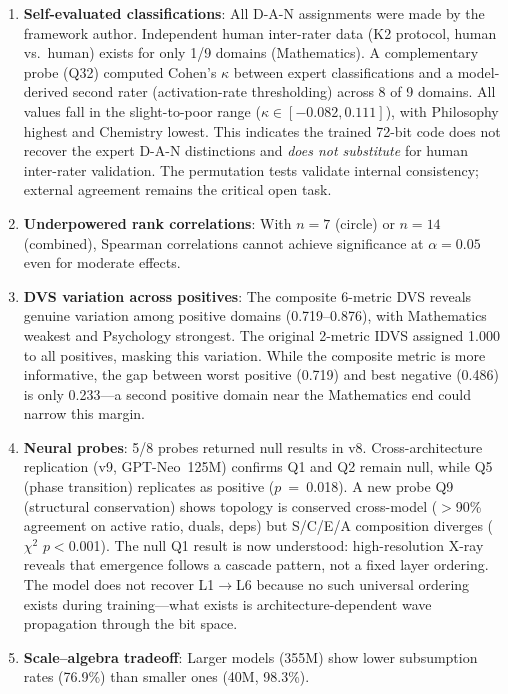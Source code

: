 \documentclass[11pt, a4paper]{article}
\begin{document}
\begin{enumerate}[nosep, leftmargin=*]
    \item \textbf{Self-evaluated classifications}: All D-A-N assignments were made by the framework author. Independent human inter-rater data (K2 protocol, human vs.\ human) exists for only 1/9 domains (Mathematics). A complementary probe (Q32) computed Cohen's $\kappa$ between expert classifications and a model-derived second rater (activation-rate thresholding) across 8 of 9 domains. All values fall in the slight-to-poor range ($\kappa \in [-0.082, 0.111]$), with Philosophy highest and Chemistry lowest. This indicates the trained 72-bit code does not recover the expert D-A-N distinctions and \emph{does not substitute} for human inter-rater validation. The permutation tests validate internal consistency; external agreement remains the critical open task.
    \item \textbf{Underpowered rank correlations}: With $n = 7$ (circle) or $n = 14$ (combined), Spearman correlations cannot achieve significance at $\alpha = 0.05$ even for moderate effects.
    \item \textbf{DVS variation across positives}: The composite 6-metric DVS reveals genuine variation among positive domains (0.719--0.876), with Mathematics weakest and Psychology strongest. The original 2-metric IDVS assigned 1.000 to all positives, masking this variation. While the composite metric is more informative, the gap between worst positive (0.719) and best negative (0.486) is only 0.233---a second positive domain near the Mathematics end could narrow this margin.
    \item \textbf{Neural probes}: 5/8 probes returned null results in v8. Cross-architecture replication (v9, GPT-Neo~125M) confirms Q1 and Q2 remain null, while Q5 (phase transition) replicates as positive ($p$~=~0.018). A new probe Q9 (structural conservation) shows topology is conserved cross-model ($>$90\% agreement on active ratio, duals, deps) but S/C/E/A composition diverges ($\chi^2$ $p<$0.001). The null Q1 result is now understood: high-resolution X-ray reveals that emergence follows a cascade pattern, not a fixed layer ordering. The model does not recover L1$\to$L6 because no such universal ordering exists during training---what exists is architecture-dependent wave propagation through the bit space.
    \item \textbf{Scale--algebra tradeoff}: Larger models (355M) show lower subsumption rates (76.9\%) than smaller ones (40M, 98.3\%).
\end{enumerate}
\end{document}
